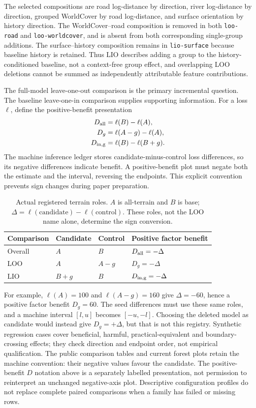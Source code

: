 The selected compositions are road log-distance by direction, river
log-distance by direction, grouped WorldCover by road log-distance, and
surface orientation by history direction. The WorldCover--road composition
is removed in both \texttt{loo-road} and \texttt{loo-worldcover}, and is absent
from both corresponding single-group additions. The surface--history
composition remains in \texttt{lio-surface} because baseline history is
retained. Thus LIO describes adding a group to the history-conditioned
baseline, not a context-free group effect, and overlapping LOO deletions
cannot be summed as independently attributable feature contributions.

The full-model leave-one-out comparison is the primary incremental question.
The baseline leave-one-in comparison supplies supporting information. For a
loss \(\ell\), define the positive-benefit presentation
\begin{align}
 D_{\rm all}&=\ell(B)-\ell(A),\\
 D_g&=\ell(A-g)-\ell(A),\\
 D_{\rm in,g}&=\ell(B)-\ell(B+g).
\end{align}
The machine inference ledger stores candidate-minus-control loss differences,
so its negative differences indicate benefit. A positive-benefit plot must
negate both the estimate and the interval, reversing the endpoints. This
explicit convention prevents sign changes during paper preparation.

\begin{table}[htbp]
\centering\small
\caption{Actual registered terrain roles. \(A\) is all-terrain and \(B\)
is base; \(\Delta=\ell(\mathrm{candidate})-\ell(\mathrm{control})\).
These roles, not the LOO name alone, determine the sign conversion.}
\label{tab:terrain-sign-roles}\hypertarget{tab:terrain-sign-roles}{}
\begin{tabular}{llll}
\toprule Comparison & Candidate & Control & Positive factor benefit\\\midrule
Overall & \(A\) & \(B\) & \(D_{\rm all}=-\Delta\)\\
LOO & \(A\) & \(A-g\) & \(D_g=-\Delta\)\\
LIO & \(B+g\) & \(B\) & \(D_{\rm in,g}=-\Delta\)\\
\bottomrule
\end{tabular}
\end{table}
For example, \(\ell(A)=100\) and \(\ell(A-g)=160\) give
\(\Delta=-60\), hence a positive factor benefit \(D_g=60\).
The seed differences must use these same roles, and a machine interval
\([l,u]\) becomes \([-u,-l]\). Choosing the deleted model as candidate
would instead give \(D_g=+\Delta\), but that is not this registry.
Synthetic regression cases cover beneficial, harmful, practical-equivalent
and boundary-crossing effects; they check direction and endpoint order,
not empirical qualification.
The public comparison tables and current forest plots retain the machine
convention: their negative values favour the candidate. The positive-benefit
\(D\) notation above is a separately labelled presentation, not permission
to reinterpret an unchanged negative-axis plot. Descriptive configuration
profiles do not replace complete paired comparisons when a family has failed
or missing rows.


